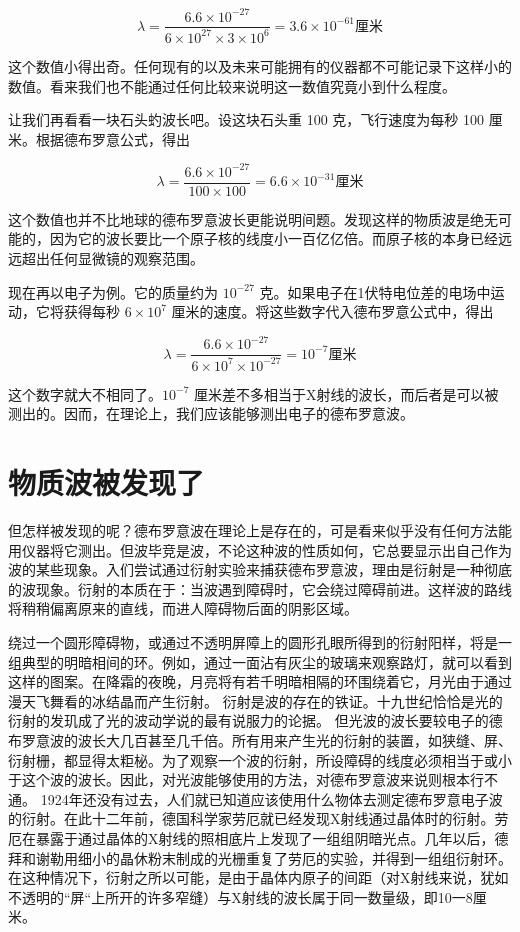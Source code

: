 $$
\lambda=\frac{6.6 \times 10^{-27}}{6 \times 10^{27} \times 3 \times 10^{6}}=3.6 \times 10^{-61} 厘米
$$

这个数值小得出奇。任何现有的以及未来可能拥有的仪器都不可能记录下这样小的数值。看来我们也不能通过任何比较来说明这一数值究竟小到什么程度。

让我们再看看一块石头虳波长吧。设这块石头重 100 克，飞行速度为每秒 100 厘米。根据德布罗意公式，得出

$$
\lambda=\frac{6.6 \times 10^{-27}}{100 \times 100}=6.6 \times 10^{-31} 厘米
$$

这个数值也并不比地球的德布罗意波长更能说明间题。发现这样的物质波是绝无可能的，因为它的波长要比一个原子核的线度小一百亿亿倍。而原子核的本身已经远远超出任何显微镜的观察范围。

现在再以电子为例。它的质量约为 $10^{-27}$ 克。如果电子在1伏特电位差的电场中运动，它将获得每秒 $6 \times 10^{7}$ 厘米的速度。将这些数字代入德布罗意公式中，得出

$$
\lambda=\frac{6.6 \times 10^{-27}}{6 \times 10^{7} \times 10^{-27}}=10^{-7} 厘米
$$

这个数字就大不相同了。$10^{-7}$ 厘米差不多相当于X射线的波长，而后者是可以被测出的。因而，在理论上，我们应该能够测出电子的德布罗意波。

\section{物质波被发现了}

但怎样被发现的呢？德布罗意波在理论上是存在的，可是看来似乎没有任何方法能用仪器将它测出。但波毕竞是波，不论这种波的性质如何，它总要显示出自己作为波的某些现象。入们尝试通过衍射实验来捕获德布罗意波，理由是衍射是一种彻底的波现象。衍射的本质在于：当波遇到障碍时，它会绕过障碍前进。这样波的路线将稍稍偏离原来的直线，而进人障碍物后面的阴影区域。

绕过一个圆形障碍物，或通过不透明屏障上的圆形孔眼所得到的衍射阳样，将是一组典型的明暗相间的环。例如，通过一面沾有灰尘的玻璃来观察路灯，就可以看到这样的图案。在降霜的夜晚，月亮将有若千明暗相隔的环围绕着它，月光由于通过漫天飞舞看的冰结晶而产生衍射。
衍射是波的存在的铁证。十九世纪恰恰是光的衍射的发玑成了光的波动学说的最有说服力的论据。
但光波的波长要较电子的德布罗意波的波长大几百甚至几千倍。所有用来产生光的衍射的装置，如狭缝、屏、衍射栅，都显得太粔柲。为了观察一个波的衍射，所设障碍的线度必须相当于或小于这个波的波长。因此，对光波能够使用的方法，对德布罗意波来说则根本行不通。
1924年还没有过去，人们就已知道应该使用什么物体去测定德布罗意电子波的衍射。在此十二年前，德国科学家劳厄就已经发现X射线通过晶体时的衍射。劳厄在暴露于通过晶体的X射线的照相底片上发现了一组组阴暗光点。几年以后，德拜和谢勒用细小的晶休粉末制成的光栅重复了劳厄的实验，并得到一组组衍射环。在这种情况下，衍射之所以可能，是由于晶体内原子的间距（对X射线来说，犹如不透明的“屏“上所开的许多窄缝）与X射线的波长属于同一数量级，即10一8厘米。

